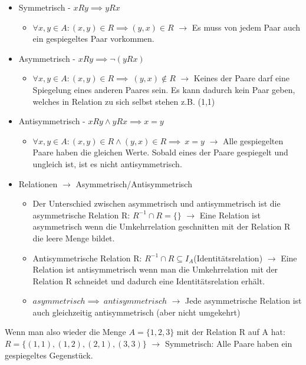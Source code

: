 \documentclass{article}
\begin{document}
	 \begin{itemize}
	 	\item{Symmetrisch - $xRy \implies yRx$}
	 	\begin{itemize}
	 		\item{$\forall x,y\in A:(x,y)\in R \implies (y,x)\in R$ $\to$ Es muss von jedem Paar auch ein gespiegeltes Paar vorkommen.}
	 	\end{itemize}
	 	\item{Asymmetrisch - $xRy \implies \neg (yRx)$}
	 	\begin{itemize}
	 		\item{$\forall x,y\in A:(x,y)\in R \implies\ (y,x) \notin R$ $\to$ Keines der Paare darf eine Spiegelung eines anderen Paares sein. Es kann dadurch kein Paar geben, welches in Relation zu sich selbst stehen z.B. (1,1)}
	 	\end{itemize}
	 	\item{Antisymmetrisch - $xRy \land yRx \implies x = y$}
	 	\begin{itemize}
	 		\item{$\forall x,y\in A:(x,y)\in R \land (y,x)\in R \implies\ x = y$ $\to$ Alle gespiegelten Paare haben die gleichen Werte. Sobald eines der Paare gespiegelt und ungleich ist, ist es nicht antisymmetrisch.}
	 	\end{itemize}
	 	\item{Relationen $\to$ Asymmetrisch/Antisymmetrisch}
		\begin{itemize}
	 		\item{Der Unterschied zwischen asymmetrisch und antisymmetrisch ist die asymmetrische Relation R: $R^{-1} \cap R = \{\}$ $\to$ Eine Relation ist asymmetrisch wenn die Umkehrrelation geschnitten mit der Relation R die leere Menge bildet.}
	 		\item{Antisymmetrische Relation R: $R^{-1} \cap R \subseteq I_A$(Identitätsrelation) $\to$ Eine Relation ist antisymmetrisch wenn man die Umkehrrelation mit der Relation R schneidet und dadurch eine Identitätsrelation erhält.}
	 		\item{$asymmetrisch \implies\ antisymmetrisch$ $\to$ Jede asymmetrische Relation ist auch gleichzeitig antisymmetrisch (aber nicht umgekehrt)}
		\end{itemize}
	 \end{itemize}
	 Wenn man also wieder die Menge $A=\{1,2,3\}$ mit der Relation R auf A hat: \\
	 $R=\{(1,1),(1,2),(2,1),(3,3)\}$ $\to$ Symmetrisch: Alle Paare haben ein gespiegeltes Gegenstück. \\
\end{document}
